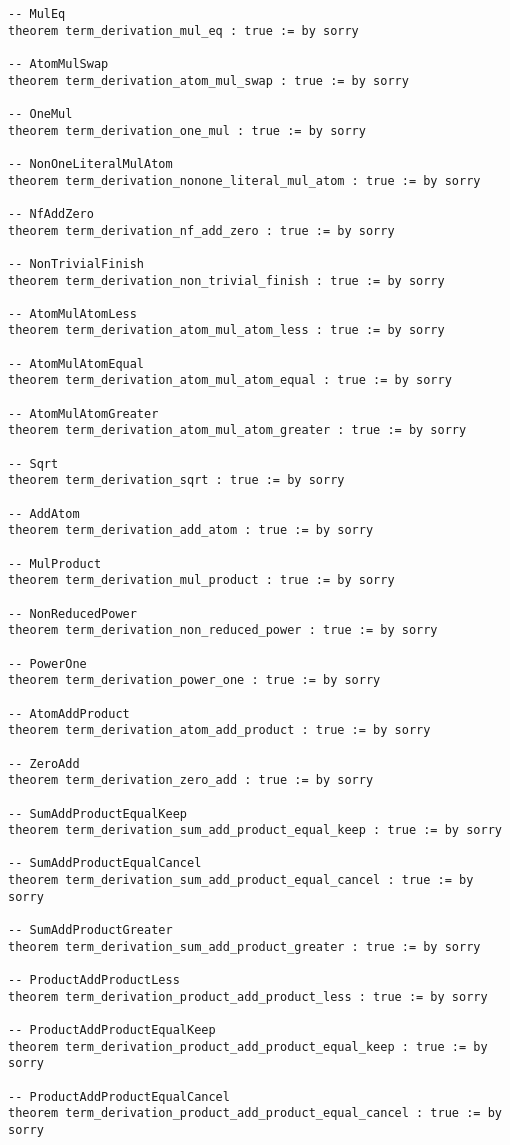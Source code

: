 \documentclass{article}
\begin{document}
\begin{tcolorbox}[colback=white!10, width=\linewidth]
\begin{lstlisting}[language=Lean4]
-- MulEq
theorem term_derivation_mul_eq : true := by sorry

-- AtomMulSwap
theorem term_derivation_atom_mul_swap : true := by sorry

-- OneMul
theorem term_derivation_one_mul : true := by sorry

-- NonOneLiteralMulAtom
theorem term_derivation_nonone_literal_mul_atom : true := by sorry

-- NfAddZero
theorem term_derivation_nf_add_zero : true := by sorry

-- NonTrivialFinish
theorem term_derivation_non_trivial_finish : true := by sorry

-- AtomMulAtomLess
theorem term_derivation_atom_mul_atom_less : true := by sorry

-- AtomMulAtomEqual
theorem term_derivation_atom_mul_atom_equal : true := by sorry

-- AtomMulAtomGreater
theorem term_derivation_atom_mul_atom_greater : true := by sorry

-- Sqrt
theorem term_derivation_sqrt : true := by sorry

-- AddAtom
theorem term_derivation_add_atom : true := by sorry

-- MulProduct
theorem term_derivation_mul_product : true := by sorry

-- NonReducedPower
theorem term_derivation_non_reduced_power : true := by sorry

-- PowerOne
theorem term_derivation_power_one : true := by sorry

-- AtomAddProduct
theorem term_derivation_atom_add_product : true := by sorry

-- ZeroAdd
theorem term_derivation_zero_add : true := by sorry

-- SumAddProductEqualKeep
theorem term_derivation_sum_add_product_equal_keep : true := by sorry

-- SumAddProductEqualCancel
theorem term_derivation_sum_add_product_equal_cancel : true := by sorry

-- SumAddProductGreater
theorem term_derivation_sum_add_product_greater : true := by sorry

-- ProductAddProductLess
theorem term_derivation_product_add_product_less : true := by sorry

-- ProductAddProductEqualKeep
theorem term_derivation_product_add_product_equal_keep : true := by sorry

-- ProductAddProductEqualCancel
theorem term_derivation_product_add_product_equal_cancel : true := by sorry


\end{lstlisting}
\end{tcolorbox}
\end{document}
